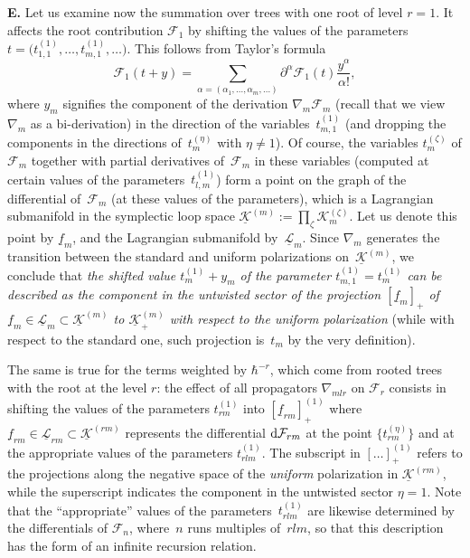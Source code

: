 \documentclass[pdftex]{sigma}
\def\F{\mathcal F}
\def\K{\mathcal K}
\def\L{\mathcal L}
\def\a{\alpha}
\def\h{\hbar}
\def\und{\underline}
\begin{document}
{\bf E.}
Let us examine now the summation over trees with one root of level
$r=1$. It affects the root contribution $\F_1$ by shifting the values of the parameters $t=\big(t_{1,1}^{(1)},\dots,t_{m,1}^{(1)},\dots\big)$. This follows from Taylor's formula
\[ \F_1(t+y)=\sum_{\a=(\a_1,\dots,\a_m,\dots)} \partial^{\a}\F_1(t)\frac{y^\a}{\a!},\]
where $y_m$ signifies the component of the derivation $\nabla_m \F_m$ (recall that we view~$\nabla_m$ as a bi-derivation) in the direction of the variables~$t_{m,1}^{(1)}$ (and dropping the components in the directions of~$t_m^{(\eta)}$ with $\eta\neq 1$). Of course, the variables $t_m^{(\zeta)}$ of $\F_m$ together with partial derivatives of~$\F_m$ in these variables (computed at certain values of the parameters~$t_{l,m}^{(1)}$) form a point on the graph of the differential of~$\F_m$ (at these values of the parameters), which is a Lagrangian submanifold in the symplectic loop space $\und{\K}^{(m)}:=\prod_{\zeta} \K_m^{(\zeta)}$. Let us denote this point by $\und{f}_m$, and the Lagrangian submanifold by~$\und{\L}_m$. Since $\nabla_m$ generates the transition between the standard and uniform polarizations on~$\und{\K}^{(m)}$,
we conclude that {\em the shifted value $t_m^{(1)}+y_m$ of the parameter $t_{m,1}^{(1)}=t_m^{(1)}$ can be described as the component in the untwisted sector of the projection $[\und{f}_m]_{+}$ of $\und{f}_m\in \und{\L}_m\subset \und{\K}^{(m)}$ to $\und{\K}^{(m)}_{+}$ with respect to the {\em uniform} polarization} (while with respect to the standard one, such projection is~$t_m$ by the very definition).

The same is true for the terms weighted by $\h^{-r}$, which come from rooted trees with the root at the level $r$: the effect of all propagators $\nabla_{mlr}$ on $\F_r$ consists in shifting the values of the parameters $t_{rm}^{(1)}$ into $[\und{f}_{rm}]_{+}^{(1)}$ where $\und{f}_{rm}\in \und{\L}_{rm}\subset \und{\K}^{(rm)}$ represents the differential ${\rm d}\F_{rm}$ at the point $\big\{ t_{rm}^{(\eta)} \big\}$ and at the appropriate values of the parameters $t_{rlm}^{(1)}$. The subscript in $[\dots]_{+}^{(1)}$ refers to the projections along the negative space of the {\em uniform} polarization in $\und{\K}^{(rm)}$, while the superscript indicates the component in the untwisted sector $\eta=1$. Note that the ``appropriate'' values of the parameters~$t_{rlm}^{(1)}$ are likewise determined by the differentials of $\F_n$, where~$n$ runs multiples of~$rlm$, so that this description has the form of an infinite recursion relation.
\end{document}
